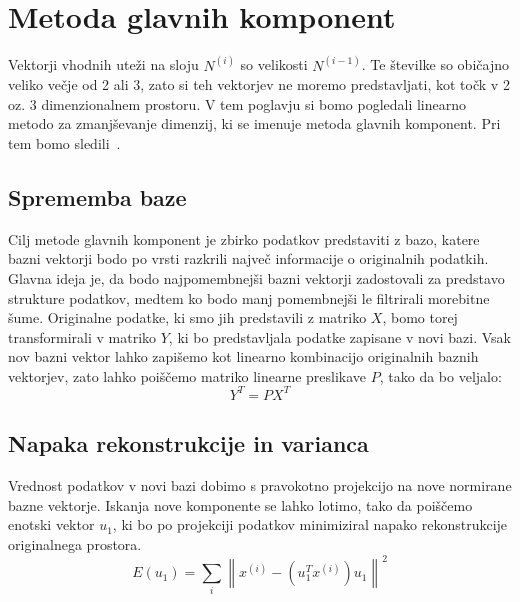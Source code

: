 \chapter{Metoda glavnih komponent}
Vektorji vhodnih uteži na sloju $N^{(i)}$ so velikosti $N^{(i - 1)}$. Te številke so običajno veliko večje od 2 ali 3, zato si teh vektorjev ne moremo predstavljati, kot točk v 2 oz. 3 dimenzionalnem prostoru. V tem poglavju si bomo pogledali linearno metodo za zmanjševanje dimenzij, ki se imenuje metoda glavnih komponent. Pri tem bomo sledili~\cite{shlens2014tutorial}.

\section{Sprememba baze}
Cilj metode glavnih komponent je zbirko podatkov predstaviti z bazo, katere bazni vektorji bodo po vrsti razkrili največ informacije o originalnih podatkih. Glavna ideja je, da bodo najpomembnejši bazni vektorji zadostovali za predstavo strukture podatkov, medtem ko bodo manj pomembnejši le filtrirali morebitne šume. Originalne podatke, ki smo jih predstavili z matriko $X$, bomo torej transformirali v matriko $Y$, ki bo predstavljala podatke zapisane v novi bazi. Vsak nov bazni vektor lahko zapišemo kot linearno kombinacijo originalnih baznih vektorjev, zato lahko poiščemo matriko linearne preslikave $P$, tako da bo veljalo:
\begin{equation}
    Y^T = PX^T
\end{equation}

\section{Napaka rekonstrukcije in varianca}
Vrednost podatkov v novi bazi dobimo s pravokotno projekcijo na nove normirane bazne vektorje. Iskanja nove komponente se lahko lotimo, tako da poiščemo enotski vektor $u_1$, ki bo po projekciji podatkov minimiziral napako rekonstrukcije originalnega prostora.
\begin{equation}
E(u_1) = \sum_{i} \left\lVert x^{(i)} - (u_{1}^{T}{x}^{(i)})u_{1} \right\rVert^2
\end{equation}

